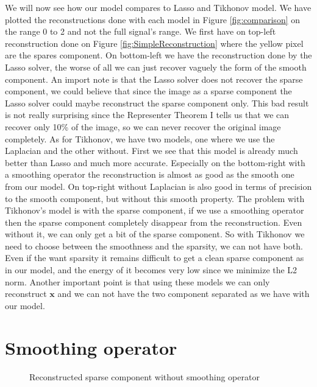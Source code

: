 \documentclass[a4paper,11pt,oneside]{report}
\theoremstyle{named}
\begin{document}
We will now see how our model compares to Lasso and Tikhonov model. We have plotted the reconstructions done with each model in Figure \ref{fig:comparison} on the range 0 to 2 and not the full signal's range. We first have on top-left reconstruction done on Figure \ref{fig:SimpleReconstruction} where the yellow pixel are the spares component. On bottom-left we have the reconstruction done by the Lasso solver, the worse of all we can just recover vaguely the form of the smooth component. An import note is that the Lasso solver does not recover the sparse component, we could believe that since the image as a sparse component the Lasso solver could maybe reconstruct the sparse component only. This bad result is not really surprising since the Representer Theorem I tells us that we can recover only 10\% of the image, so we can never recover the original image completely. As for Tikhonov, we have two models, one where we use the Laplacian and the other without. First we see that this model is already much better than Lasso and much more accurate. Especially on the bottom-right with a smoothing operator the reconstruction is almost as good as the smooth one from our model. On top-right without Laplacian is also good in terms of precision to the smooth component, but without this smooth property. The problem with Tikhonov's model is with the sparse component, if we use a smoothing operator then the sparse component completely disappear from the reconstruction. Even without it, we can only get a bit of the sparse component. So with Tikhonov we need to choose between the smoothness and the sparsity, we can not have both. Even if the want sparsity it remains difficult to get a clean sparse component as in our model, and the energy of it becomes very low since we minimize the L2 norm. Another important point is that using these models we can only reconstruct $\boldsymbol{x}$ and we can not have the two component separated as we have with our model.

\section{Smoothing operator}

\begin{figure}
    \centering
    \caption{Reconstructed sparse component without smoothing operator}
    \label{fig:sparse_without_smooth}
\end{figure}
\end{document}

